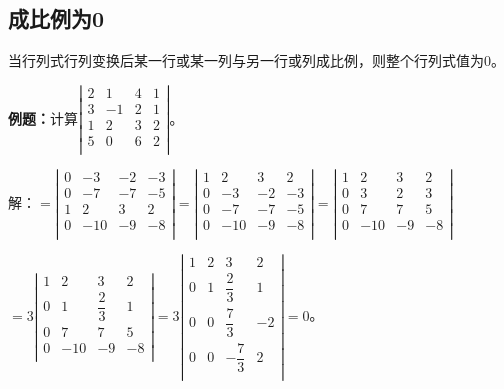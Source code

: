 \documentclass[UTF8, 12pt]{ctexart}
\begin{document}
\subsection{成比例为0}

当行列式行列变换后某一行或某一列与另一行或列成比例，则整个行列式值为0。

\textbf{例题：}计算$\left|\begin{array}{cccc} 
    2 & 1 & 4 & 1 \\
    3 & -1  & 2 & 1 \\
    1 & 2 & 3 & 2 \\
    5 & 0 & 6 & 2 \\
\end{array}\right|$。

解：$=\left|\begin{array}{cccc} 
    0 & -3 & -2 & -3 \\
    0 & -7  & -7 & -5 \\
    1 & 2 & 3 & 2 \\
    0 & -10 & -9 & -8 \\
\end{array}\right|=\left|\begin{array}{cccc} 
    1 & 2 & 3 & 2 \\
    0 & -3 & -2 & -3 \\
    0 & -7  & -7 & -5 \\
    0 & -10 & -9 & -8 \\
\end{array}\right|=\left|\begin{array}{cccc} 
    1 & 2 & 3 & 2 \\
    0 & 3 & 2 & 3 \\
    0 & 7  & 7 & 5 \\
    0 & -10 & -9 & -8 \\
\end{array}\right|$

$=3\left|\begin{array}{cccc} 
    1 & 2 & 3 & 2 \\
    0 & 1 & \dfrac{2}{3} & 1 \\
    0 & 7  & 7 & 5 \\
    0 & -10 & -9 & -8 \\
\end{array}\right|
=3\left|\begin{array}{cccc} 
    1 & 2 & 3 & 2 \\
    0 & 1 & \dfrac{2}{3} & 1 \\
    0 & 0  & \dfrac{7}{3} & -2 \\
    0 & 0  & -\dfrac{7}{3} & 2 \\
\end{array}\right|=0$。
\end{document}
